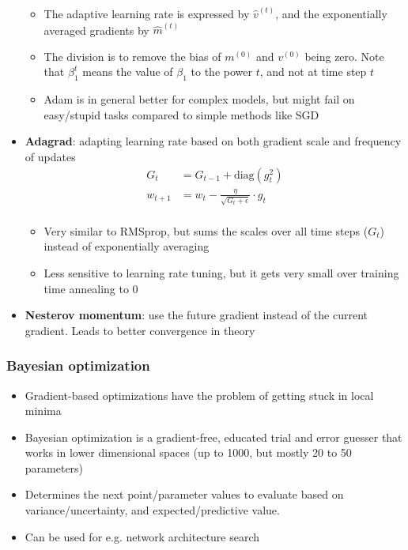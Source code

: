 \begin{itemize}
\begin{itemize}
		\item The adaptive learning rate is expressed by $\hat{v}^{(t)}$, and the exponentially averaged gradients by $\hat{m}^{(t)}$
		\item The division is to remove the bias of $m^{(0)}$ and $v^{(0)}$ being zero. Note that $\beta_1^t$ means the value of $\beta_1$ to the power $t$, and not at time step $t$
		\item Adam is in general better for complex models, but might fail on easy/stupid tasks compared to simple methods like SGD
	\end{itemize}
	\item \textbf{Adagrad}: adapting learning rate based on both gradient scale and frequency of updates
	\begin{equation*}
		\begin{split}
			G_t & = G_{t-1} + \text{diag}\left(g_t^2\right)\\
			w_{t+1} & = w_{t} - \frac{\eta}{\sqrt{G_t + \epsilon}}\cdot g_t\\
		\end{split}
	\end{equation*}
	\begin{itemize}
		\item Very similar to RMSprop, but sums the scales over all time steps ($G_t$) instead of exponentially averaging 
		\item Less sensitive to learning rate tuning, but it gets very small over training time annealing to 0
	\end{itemize} 
	\item \textbf{Nesterov momentum}: use the future gradient instead of the current gradient. Leads to better convergence in theory
\end{itemize}
\subsubsection{Bayesian optimization}
\begin{itemize}
	\item Gradient-based optimizations have the problem of getting stuck in local minima
	\item Bayesian optimization is a gradient-free, educated trial and error guesser that works in lower dimensional spaces (up to 1000, but mostly 20 to 50 parameters)
	\item Determines the next point/parameter values to evaluate based on variance/uncertainty, and expected/predictive value. 
	\item Can be used for e.g. network architecture search
\end{itemize}
